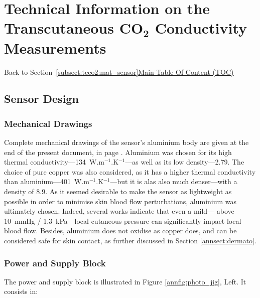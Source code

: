 \chapter{Technical Information on the Transcutaneous \texorpdfstring{CO$_\textbf{2}$}{CO2} Conductivity Measurements}\label{app:tcco2_sm}

\begin{appbox}
	Back to Section~\ref{subsect:tcco2:mat_sensor}\hfill \hyperref[chapter:toc]{Main Table Of Content (TOC)}
\end{appbox}

\section{Sensor Design}

\subsection{Mechanical Drawings}

Complete mechanical drawings of the sensor's aluminium body are given at the end of the present document, in page \pageref{annapp:al_body_drawing}. Aluminium was chosen for its high thermal conductivity---134~W.m$^{-1}$.K$^{-1}$---as well as its low density---2.79\cite{euralliage2017a}. The choice of pure copper was also considered, as it has a higher thermal conductivity than aluminium---401~W.m$^{-1}$.K$^{-1}$---but it is alas also much denser---with a density of 8.9\cite{davis2001_copper}. As it seemed desirable to make the sensor as lightweight as possible in order to minimise skin blood flow perturbations, aluminium was ultimately chosen. Indeed, several works indicate that even a mild---\ie{} above 10~mmHg / 1.3~kPa---local cutaneous pressure can significantly impact local blood flow\cite{daly1976, sacks1988, anosov2020}. Besides, aluminium does not oxidise as copper does, and can be considered safe for skin contact, as further discussed in Section \ref{annsect:dermato}.

\subsection{Power and Supply Block}

The power and supply block is illustrated in Figure \ref{annfig:photo_jig}, Left. It consists in:

